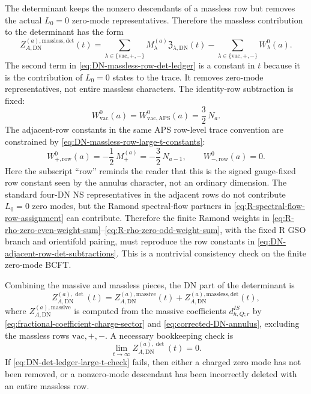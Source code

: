 \documentclass[11pt]{article}
\newcommand{\vac}{\mathrm{vac}}
\newcommand{\DN}{\mathrm{DN}}
\begin{document}
The determinant keeps the nonzero descendants of a massless row but removes the actual \(L_0=0\)
zero-mode representatives. Therefore the massless contribution to
the determinant has the form
\begin{equation}
  Z_{A,\DN}^{(a),\mathrm{massless,det}}(t)
  =
  \sum_{\lambda\in\{\vac,+,-\}}
  M_{\lambda}^{(a)}\mathfrak Z_{\lambda,\DN}(t)
  -
  \sum_{\lambda\in\{\vac,+,-\}}W_{\lambda}^{0}(a).
  \label{eq:DN-massless-row-det-ledger}
\end{equation}
The second term in \eqref{eq:DN-massless-row-det-ledger} is a constant in \(t\) because it is
the contribution of \(L_0=0\) states to the trace. It removes zero-mode representatives, not
entire massless characters. The identity-row subtraction is fixed:
\begin{equation}
  W_{\vac}^{0}(a)=W_{\vac,\mathrm{APS}}^{0}(a)=\frac32\,N_a.
  \label{eq:DN-vac-row-det-subtraction}
\end{equation}
The adjacent-row constants in the same APS row-level trace convention are constrained by
\eqref{eq:DN-massless-row-large-t-constants}:
\begin{equation}
  W_{+,\mathrm{row}}^{0}(a)=-\frac12\,M_{+}^{(a)}=-\frac32\,N_{a-1},
  \qquad
  W_{-,\mathrm{row}}^{0}(a)=0.
  \label{eq:DN-adjacent-row-det-subtractions}
\end{equation}
Here the subscript ``row'' reminds the reader that this is the signed gauge-fixed row constant
seen by the annulus character, not an ordinary dimension. The standard four-DN NS
representatives in the adjacent rows do not contribute \(L_0=0\) zero modes, but the Ramond
spectral-flow partners in \eqref{eq:R-spectral-flow-row-assignment} can contribute. Therefore
the finite Ramond weights in
\eqref{eq:R-rho-zero-even-weight-sum}--\eqref{eq:R-rho-zero-odd-weight-sum}, with the fixed R
GSO branch and orientifold pairing, must reproduce the row constants in
\eqref{eq:DN-adjacent-row-det-subtractions}. This is a nontrivial consistency check on the
finite zero-mode BCFT.

Combining the massive and massless pieces, the DN part of the determinant is
\begin{equation}
  Z_{A,\DN}^{(a),\det}(t)
  =
  Z_{A,\DN}^{(a),\mathrm{massive}}(t)
  +
  Z_{A,\DN}^{(a),\mathrm{massless,det}}(t),
  \label{eq:DN-det-massive-plus-massless}
\end{equation}
where \(Z_{A,\DN}^{(a),\mathrm{massive}}\) is computed from the massive coefficients
\(d_{h,Q;r}^{IS}\) by \eqref{eq:fractional-coefficient-charge-sector} and
\eqref{eq:corrected-DN-annulus}, excluding the massless rows \(\vac,+,-\). A necessary
bookkeeping check is
\begin{equation}
  \lim_{t\to\infty}Z_{A,\DN}^{(a),\det}(t)=0.
  \label{eq:DN-det-ledger-large-t-check}
\end{equation}
If \eqref{eq:DN-det-ledger-large-t-check} fails, then either a charged zero mode has not been
removed, or a nonzero-mode descendant has been incorrectly deleted with an entire massless row.
\end{document}
